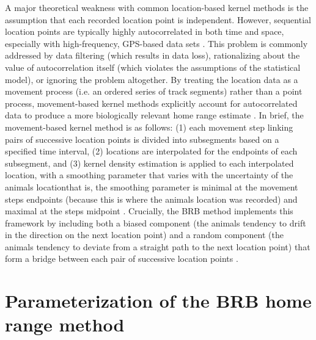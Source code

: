 \documentclass{article}\usepackage[]{graphicx}\usepackage[]{color}
\begin{document}
A major theoretical weakness with common location-based kernel methods is the assumption that each recorded location point is independent. However, sequential location points are typically highly autocorrelated in both time and space, especially with high-frequency, GPS-based data sets \parencite{Boyce2010, Fieberg2010}. This problem is commonly addressed by data filtering (which results in data loss), rationalizing about the value of autocorrelation itself (which violates the assumptions of the statistical model), or ignoring the problem altogether. By treating the location data as a movement process (i.e. an ordered series of track segments) rather than a point process, movement-based kernel methods explicitly account for autocorrelated data to produce a more biologically relevant home range estimate \parencite{Benhamou2010}. In brief, the movement-based kernel method is as follows: (1) each movement step linking pairs of successive location points is divided into subsegments based on a specified time interval, (2) locations are interpolated for the endpoints of each subsegment, and (3) kernel density estimation is applied to each interpolated location, with a smoothing parameter that varies with the uncertainty of the animals locationthat is, the smoothing parameter is minimal at the movement steps endpoints (because this is where the animals location was recorded) and maximal at the steps midpoint \parencite{Benhamou2010}. Crucially, the BRB method implements this framework by including both a biased component (the animals tendency to drift in the direction on the next location point) and a random component (the animals tendency to deviate from a straight path to the next location point) that form a bridge between each pair of successive location points \parencite{Benhamou2011}.

\section*{Parameterization of the BRB home range method}
\end{document}
